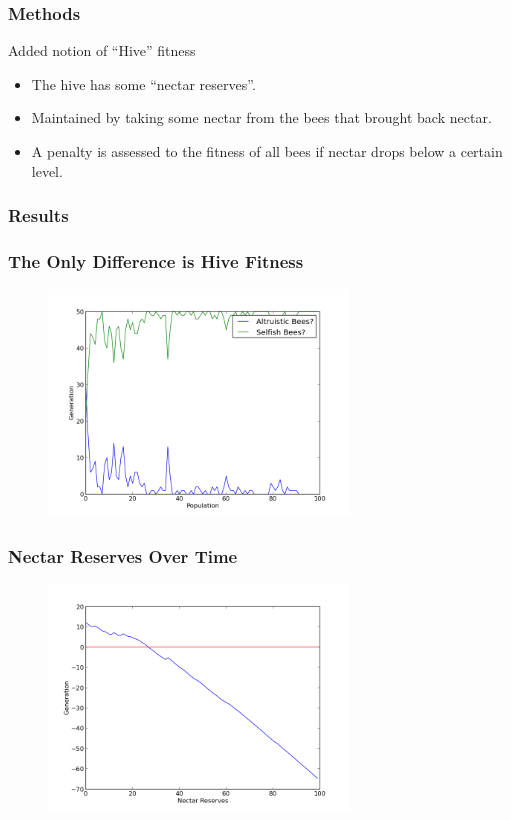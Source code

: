 \documentclass{beamer}
\begin{document}
      \subsubsection{Methods} %
      \label{ssub:methods}
        \begin{frame}{Added notion of ``Hive'' fitness}
          \begin{itemize}
            \item The hive has some ``nectar reserves''.
            \item Maintained by taking some nectar from the bees that brought 
                  back nectar.
            \item A penalty is assessed to the fitness of all bees if nectar 
                  drops below a certain level.
          \end{itemize}
        \end{frame}

      \subsubsection{Results} %
      \label{ssub:results}

        \begin{frame}[t]\frametitle{The Only Difference is Hive Fitness}
          \begin{figure}
          \includegraphics[width=8cm]{hive_influenced_bees.png}
          \end{figure}
        \end{frame}

        \begin{frame}[t]\frametitle{Nectar Reserves Over Time}
          \begin{figure}
          \includegraphics[width=8cm]{hive_influenced_bees_nectar.png}
          \end{figure}
        \end{frame}
\end{document}
